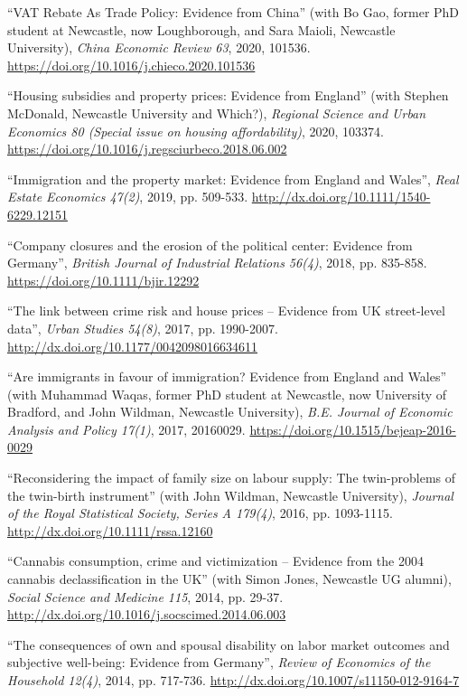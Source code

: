 \documentclass[10pt,pdftex,a4paper,oneside]{article}
\begin{document}
\begin{etaremune}
\item ``VAT Rebate As Trade Policy: Evidence from China'' (with Bo Gao, former PhD student at Newcastle, now Loughborough, and Sara Maioli, Newcastle University), \emph{China Economic Review 63}, 2020, 101536.   \url{https://doi.org/10.1016/j.chieco.2020.101536}
\item ``Housing subsidies and property prices: Evidence from England'' (with Stephen McDonald, Newcastle University and Which?),  \emph{Regional Science and Urban Economics 80 (Special issue on housing affordability)}, 2020, 103374.  \url{https://doi.org/10.1016/j.regsciurbeco.2018.06.002}
\item ``Immigration and the property market: Evidence from England and Wales'',  \emph{Real Estate Economics 47(2)}, 2019, pp. 509-533. \url{http://dx.doi.org/10.1111/1540-6229.12151}
\item ``Company closures and the erosion of the political center: Evidence from Germany'', \emph{British Journal of Industrial Relations 56(4)}, 2018, pp. 835-858. \url{https://doi.org/10.1111/bjir.12292}
\item ``The link between crime risk and house prices -- Evidence from UK street-level data'',  \emph{Urban Studies 54(8)}, 2017, pp. 1990-2007. \url{http://dx.doi.org/10.1177/0042098016634611}
\item ``Are immigrants in favour of immigration? Evidence from England and Wales'' (with Muhammad Waqas, former PhD student at Newcastle, now University of Bradford, and John Wildman, Newcastle University), \emph{B.E. Journal of Economic Analysis and Policy 17(1)}, 2017, 20160029.  \url{https://doi.org/10.1515/bejeap-2016-0029}
\item ``Reconsidering the impact of family size on labour supply: The twin-problems of the twin-birth instrument'' (with John Wildman, Newcastle University), \emph{Journal of the Royal Statistical Society, Series A 179(4)}, 2016, pp. 1093-1115.  \url{http://dx.doi.org/10.1111/rssa.12160}
\item ``Cannabis consumption, crime and victimization -- Evidence from the 2004 cannabis declassification in the UK'' (with Simon Jones, Newcastle UG alumni), \emph{Social Science and Medicine 115}, 2014, pp. 29-37.  \url{http://dx.doi.org/10.1016/j.socscimed.2014.06.003}
\item ``The consequences of own and spousal disability on labor market outcomes and subjective well-being: Evidence from Germany'', \emph{Review of Economics of the Household 12(4)}, 2014, pp. 717-736.   \url{http://dx.doi.org/10.1007/s11150-012-9164-7}

\end{etaremune}
\end{document}
